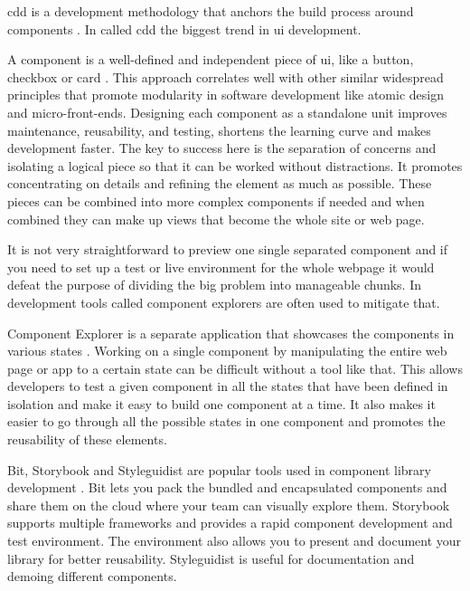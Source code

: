 \documentclass{master_thesis}
\begin{document}

\ac{cdd} is a development methodology that anchors the build process around components \citep{Coleman2017}. In \citeyear{Coleman2017} \citeauthor{Coleman2017} called \ac{cdd} the biggest trend in \ac{ui} development.

A component is a well-defined and independent piece of \ac{ui}, like a button, checkbox or card \citep{Ella2019}. This approach correlates well with other similar widespread principles that promote modularity in software development like atomic design and micro-front-ends. Designing each component as a standalone unit improves maintenance, reusability, and testing, shortens the learning curve and makes development faster. The key to success here is the separation of concerns and isolating a logical piece so that it can be worked without distractions. It promotes concentrating on details and refining the element as much as possible. These pieces can be combined into more complex components if needed and when combined they can make up views that become the whole site or web page.

It is not very straightforward to preview one single separated component and if you need to set up a test or live environment for the whole webpage it would defeat the purpose of dividing the big problem into manageable chunks. In development tools called component explorers are often used to mitigate that.

Component Explorer is a separate application that showcases the components in various states \citep{Coleman2017}. Working on a single component by manipulating the entire web page or app to a certain state can be difficult without a tool like that. This allows developers to test a given component in all the states that have been defined in isolation and make it easy to build one component at a time. It also makes it easier to go through all the possible states in one component and promotes the reusability of these elements.

Bit, Storybook and Styleguidist are popular tools used in component library development \citep{Ella2019}. Bit lets you pack the bundled and encapsulated components and share them on the cloud where your team can visually explore them. Storybook supports multiple frameworks and provides a rapid component development and test environment. The environment also allows you to present and document your library for better reusability. Styleguidist is useful for documentation and demoing different components.
\end{document}
